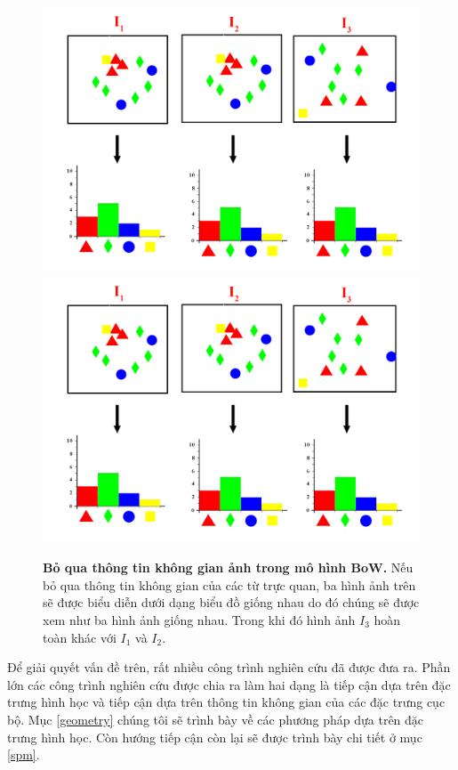 \begin{figure}[!htbp]
  \begin{center}
    \leavevmode
    \ifpdf
      \includegraphics[scale=0.2]{example}
    \else
      \includegraphics[scale=0.2]{example}
    \fi
    \caption[Bỏ qua thông tin không gian ảnh trong mô hình BoW]{\textbf{Bỏ qua thông tin không gian ảnh trong mô hình BoW.} Nếu bỏ qua thông tin không gian của các từ trực quan, ba hình ảnh trên sẽ được biểu diễn dưới dạng biểu đồ giống nhau do đó chúng sẽ được xem như ba hình ảnh giống nhau. Trong khi đó hình ảnh $I_3$ hoàn toàn khác với $I_1$ và $I_2$.}
    \label{FigExample}
  \end{center}
\end{figure}

Để giải quyết vấn đề trên, rất nhiều công trình nghiên cứu đã được đưa ra. Phần lớn các công trình nghiên cứu được chia ra làm hai dạng là tiếp cận dựa trên đặc trưng hình học và tiếp cận dựa trên thông tin không gian của các đặc trưng cục bộ. Mục \ref{geometry} chúng tôi sẽ trình bày về các phương pháp dựa trên đặc trưng hình học. Còn hướng tiếp cận còn lại sẽ được trình bày chi tiết ở mục \ref{spm}.

